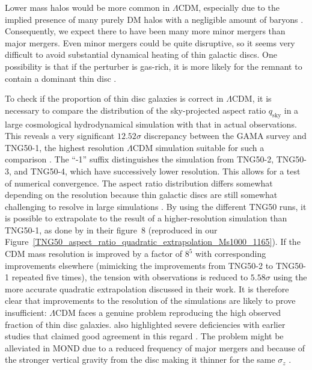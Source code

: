 \documentclass[fleqn,usenatbib,useAMS,onecolumn]{mnras} %
\begin{document}
Lower mass halos would be more common in $\Lambda$CDM, especially due to the implied presence of many purely DM halos with a negligible amount of baryons \citep[e.g.][]{Kim_2018}. Consequently, we expect there to have been many more minor mergers than major mergers. Even minor mergers could be quite disruptive, so it seems very difficult to avoid substantial dynamical heating of thin galactic discs. One possibility is that if the perturber is gas-rich, it is more likely for the remnant to contain a dominant thin disc \citep{Hopkins_2009}.

To check if the proportion of thin disc galaxies is correct in $\Lambda$CDM, it is necessary to compare the distribution of the sky-projected aspect ratio $q_{\mathrm{sky}}$ in a large cosmological hydrodynamical simulation with that in actual observations. This reveals a very significant $12.52\sigma$ discrepancy between the GAMA survey and TNG50-1, the highest resolution $\Lambda$CDM simulation suitable for such a comparison \citep{Haslbauer_2022}. The ``-1'' suffix distinguishes the simulation from TNG50-2, TNG50-3, and TNG50-4, which have successively lower resolution. This allows for a test of numerical convergence. The aspect ratio distribution differs somewhat depending on the resolution because thin galactic discs are still somewhat challenging to resolve in large simulations \citep{Ludlow_2021}. By using the different TNG50 runs, it is possible to extrapolate to the result of a higher-resolution simulation than TNG50-1, as done by \citet{Haslbauer_2022} in their figure~8 (reproduced in our Figure~\ref{TNG50_aspect_ratio_quadratic_extrapolation_Ms1000_1165}). If the CDM mass resolution is improved by a factor of $8^5$ with corresponding improvements elsewhere (mimicking the improvements from TNG50-2 to TNG50-1 repeated five times), the tension with observations is reduced to $5.58\sigma$ using the more accurate quadratic extrapolation discussed in their work. It is therefore clear that improvements to the resolution of the simulations are likely to prove insufficient: $\Lambda$CDM faces a genuine problem reproducing the high observed fraction of thin disc galaxies. \citet{Haslbauer_2022} also highlighted severe deficiencies with earlier studies that claimed good agreement in this regard \citep{Vogelsberger_2014, Bottrell_2017a, Bottrell_2017b}. The problem might be alleviated in MOND due to a reduced frequency of major mergers and because of the stronger vertical gravity from the disc making it thinner for the same $\sigma_z$ \citep{McGaugh_1998}.
\end{document}

